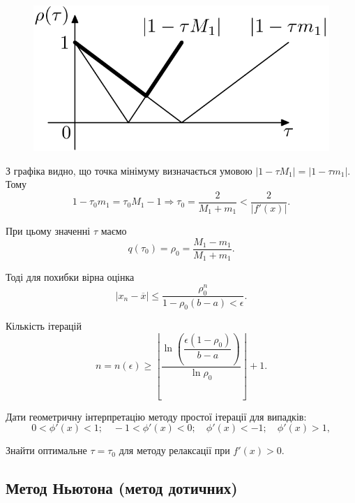 \begin{figure}[H]
	\centering
	\includegraphics[width=.5\linewidth]{mal-1.png}
\end{figure}


З графіка видно, що точка мінімуму визначається умовою $|1 - \tau M_1| = |1 - \tau m_1|$. \\

Тому
\[ 1 - \tau_0 m_1 = \tau_0 M_1 - 1 \Rightarrow \tau_0 = \dfrac{2}{M_1+m_1}<\dfrac{2}{|f'(x)|}.\]

При цьому значенні $\tau$ маємо \[q(\tau_0) = \rho_0 =\dfrac{M_1-m_1}{M_1+m_1}.\]

Тоді для похибки вірна оцінка \[|x_n-\overline{x}|\le \dfrac{\rho_0^n}{1-\rho_0(b-a)<\epsilon}.\]

Кількість ітерацій \[n = n(\epsilon) \ge \left\lfloor \dfrac{\ln \left(\dfrac{\epsilon(1-\rho_0)}{b-a}\right)}{\ln \rho_0} \right\rfloor + 1.\]	

\begin{problem} 
	Дати геометричну інтерпретацію методу простої ітерації для випадків:
	\[ 0 < \phi'(x) < 1; \quad -1 < \phi'(x) < 0; \quad \phi'(x) < -1; \quad \phi'(x) > 1,\]
\end{problem}

\begin{problem} 
	Знайти оптимальне $\tau = \tau_0$ для методу релаксації при $f'(x) > 0$.
\end{problem}

\subsection{Метод Ньютона (метод дотичних)}

